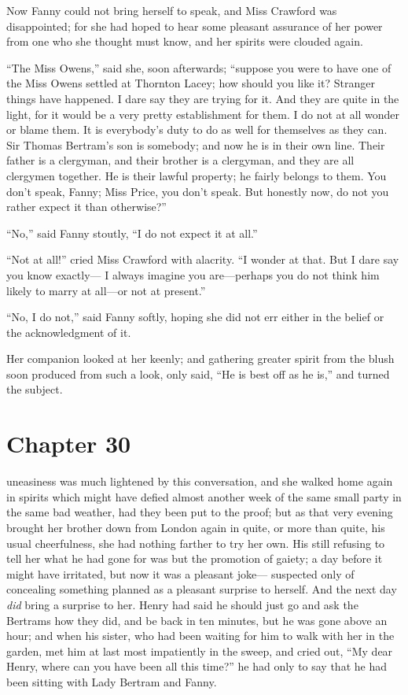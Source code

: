 Now Fanny could not bring herself to speak, and Miss
Crawford was disappointed; for she had hoped to hear
some pleasant assurance of her power from one who she
thought must know, and her spirits were clouded again.

``The Miss Owens,'' said she, soon afterwards; ``suppose you
were to have one of the Miss Owens settled at Thornton Lacey;
how should you like it?  Stranger things have happened.
I dare say they are trying for it.  And they are quite
in the light, for it would be a very pretty establishment
for them.  I do not at all wonder or blame them.  It is
everybody's duty to do as well for themselves as they can.
Sir Thomas Bertram's son is somebody; and now he is in their
own line.  Their father is a clergyman, and their brother
is a clergyman, and they are all clergymen together.
He is their lawful property; he fairly belongs to them.
You don't speak, Fanny; Miss Price, you don't speak.
But honestly now, do not you rather expect it than otherwise?''

``No,'' said Fanny stoutly, ``I do not expect it at all.''

``Not at all!'' cried Miss Crawford with alacrity.
``I wonder at that.  But I dare say you know exactly---%
I always imagine you are---perhaps you do not think him
likely to marry at all---or not at present.''

``No, I do not,'' said Fanny softly, hoping she did not err
either in the belief or the acknowledgment of it.

Her companion looked at her keenly; and gathering greater
spirit from the blush soon produced from such a look,
only said, ``He is best off as he is,'' and turned the subject.



\chapter{Chapter 30}

 uneasiness was much lightened by
this conversation, and she walked home again in spirits
which might have defied almost another week of the same
small party in the same bad weather, had they been put
to the proof; but as that very evening brought her brother
down from London again in quite, or more than quite,
his usual cheerfulness, she had nothing farther to try
her own.  His still refusing to tell her what he had gone
for was but the promotion of gaiety; a day before it
might have irritated, but now it was a pleasant joke---%
suspected only of concealing something planned as a pleasant
surprise to herself.  And the next day \emph{did} bring a
surprise to her.  Henry had said he should just go and ask
the Bertrams how they did, and be back in ten minutes,
but he was gone above an hour; and when his sister,
who had been waiting for him to walk with her in the garden,
met him at last most impatiently in the sweep, and cried out,
``My dear Henry, where can you have been all this time?''
he had only to say that he had been sitting with Lady
Bertram and Fanny.

